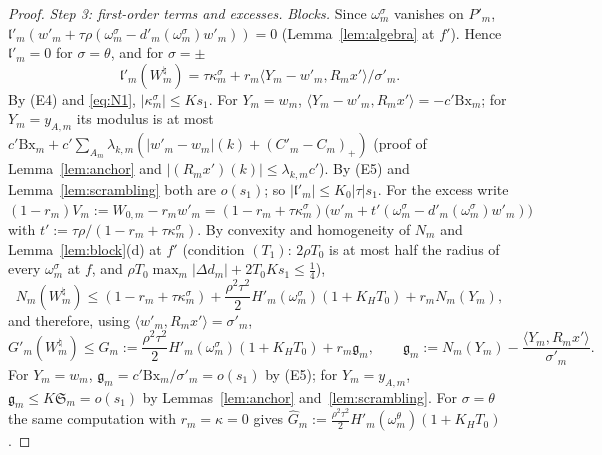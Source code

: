 \documentclass[10pt]{amsart}
\theoremstyle{definition}
\theoremstyle{remark}
\newcommand{\ip}[2]{\langle #1,#2\rangle}
\newcommand{\lin}{\mathfrak l}
\begin{document}
\begin{proof}
\emph{Step 3: first-order terms and excesses.}
\emph{Blocks.}  Since $\omega^\sigma_m$ vanishes on $P'_m$,
$\lin'_m(w'_m+\tau\rho(\omega^\sigma_m-d'_m(\omega^\sigma_m)w'_m))=0$
(Lemma~\ref{lem:algebra} at $f'$).  Hence $\lin'_m=0$ for $\sigma=\theta$, and
for $\sigma=\pm$
\[
 \lin'_m(W^\natural_m)=\tau\kappa^\sigma_m+r_m\ip{Y_m-w'_m}{R_mx'}/\sigma'_m .
\]
By (E4) and \eqref{eq:N1}, $|\kappa^\sigma_m|\le Ks_1$.  For $Y_m=w_m$,
$\ip{Y_m-w'_m}{R_mx'}=-c'\mathrm{Bx}_m$; for $Y_m=y_{A,m}$ its modulus is at
most $c'\mathrm{Bx}_m+c'\sum_{A_m}\lambda_{k,m}(|w'_m-w_m|(k)+(C'_m-C_m)_+)$
(proof of Lemma~\ref{lem:anchor} and $|(R_mx')(k)|\le\lambda_{k,m}c'$).  By
(E5) and Lemma~\ref{lem:scrambling} both are $o(s_1)$; so
$|\lin'_m|\le K_0|\tau|s_1$.  For the excess write
$(1-r_m)V_m:=W_{0,m}-r_mw'_m=(1-r_m+\tau\kappa^\sigma_m)\big(w'_m+t'
(\omega^\sigma_m-d'_m(\omega^\sigma_m)w'_m)\big)$ with
$t':=\tau\rho/(1-r_m+\tau\kappa^\sigma_m)$.  By convexity and homogeneity of
$N_m$ and Lemma~\ref{lem:block}(d) at $f'$ (condition $(T_1)$: $2\rho T_0$ is
at most half the radius of every $\omega^\sigma_m$ at $f$, and
$\rho T_0\max_m|\Delta d_m|+2T_0Ks_1\le\frac14$),
\[
 N_m(W^\natural_m)\le(1-r_m+\tau\kappa^\sigma_m)+\frac{\rho^2\tau^2}2
 H'_m(\omega^\sigma_m)(1+K_HT_0)+r_mN_m(Y_m),
\]
and therefore, using $\ip{w'_m}{R_mx'}=\sigma'_m$,
\[
 G'_m(W^\natural_m)\le\hat G_m:=\frac{\rho^2\tau^2}2H'_m(\omega^\sigma_m)
 (1+K_HT_0)+r_m\mathfrak g_m,\qquad
 \mathfrak g_m:=N_m(Y_m)-\frac{\ip{Y_m}{R_mx'}}{\sigma'_m}.
\]
For $Y_m=w_m$, $\mathfrak g_m=c'\mathrm{Bx}_m/\sigma'_m=o(s_1)$ by (E5);
for $Y_m=y_{A,m}$, $\mathfrak g_m\le K\mathfrak S_m=o(s_1)$ by
Lemmas~\ref{lem:anchor} and~\ref{lem:scrambling}.  For $\sigma=\theta$ the
same computation with $r_m=\kappa=0$ gives $\hat G_m:=\frac{\rho^2\tau^2}2
H'_m(\omega^\theta_m)(1+K_HT_0)$.


\end{proof}
\end{document}
